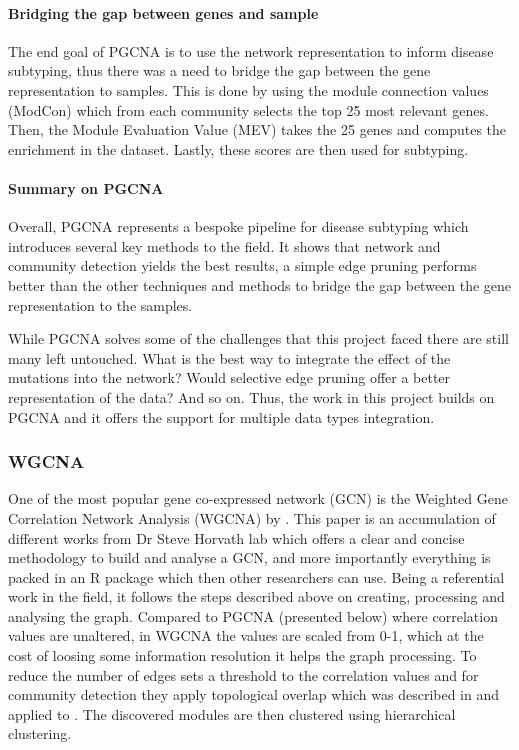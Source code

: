 \paragraph*{Bridging the gap between genes and sample}

The end goal of PGCNA is to use the network representation to inform disease subtyping, thus there was a need to bridge the gap between the gene representation to samples. This is done by using the module connection values (ModCon) which from each community selects the top 25 most relevant genes. Then, the Module Evaluation Value (MEV) takes the 25 genes and computes the enrichment in the dataset. Lastly, these scores are then used for subtyping.

\paragraph*{Summary on PGCNA}

Overall, PGCNA represents a bespoke pipeline for disease subtyping which introduces several key methods to the field. It shows that network and community detection yields the best results, a simple edge pruning performs better than the other techniques and methods to bridge the gap between the gene representation to the samples.

While PGCNA solves some of the challenges that this project faced there are still many left untouched. What is the best way to integrate the effect of the mutations into the network? Would selective edge pruning offer a better representation of the data? And so on. Thus, the work in this project builds on PGCNA and it offers the support for multiple data types integration.

\subsubsection{WGCNA}

One of the most popular gene co-expressed network (GCN) is the Weighted Gene Correlation Network Analysis (WGCNA) by \citet{Langfelder2008-sn}. This paper is an accumulation of different works from Dr Steve Horvath lab which offers a clear and concise methodology to build and analyse a GCN, and more importantly everything is packed in an R package which then other researchers can use. Being a referential work in the field, it follows the steps described above on creating, processing and analysing the graph. Compared to PGCNA (presented below) where correlation values are unaltered, in WGCNA the values are scaled from 0-1, which at the cost of loosing some information resolution it helps the graph processing. To reduce the number of edges \citet{Langfelder2008-sn} sets a threshold to the correlation values and for community detection they apply topological overlap which was described in\citet{Zhang2005-xq} and applied to \citet{Yip2007-mr, Li2007-vz, Ravasz2002-au}. The discovered modules are then clustered using hierarchical clustering.

